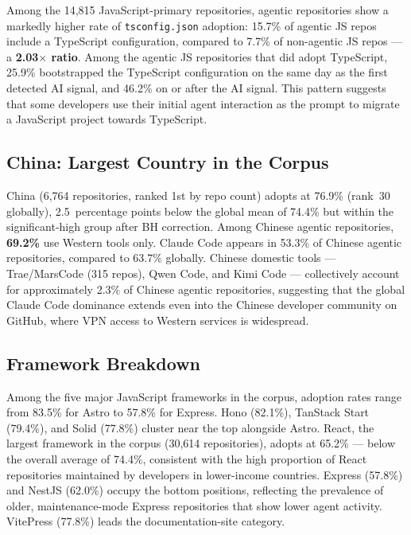 Among the 14,815 JavaScript-primary repositories, agentic repositories show a markedly higher rate of \texttt{tsconfig.json} adoption: 15.7\% of agentic JS repos include a TypeScript configuration, compared to 7.7\% of non-agentic JS repos --- a \textbf{2.03$\times$ ratio}. Among the agentic JS repositories that did adopt TypeScript, 25.9\% bootstrapped the TypeScript configuration on the same day as the first detected AI signal, and 46.2\% on or after the AI signal. This pattern suggests that some developers use their initial agent interaction as the prompt to migrate a JavaScript project towards TypeScript.

\subsection{China: Largest Country in the Corpus}

China (6,764 repositories, ranked 1st by repo count) adopts at 76.9\% (rank~30 globally), 2.5~percentage points below the global mean of 74.4\% but within the significant-high group after BH correction. Among Chinese agentic repositories, \textbf{69.2\%} use Western tools only. Claude Code appears in 53.3\% of Chinese agentic repositories, compared to 63.7\% globally. Chinese domestic tools --- Trae/MarsCode (315 repos), Qwen Code, and Kimi Code --- collectively account for approximately 2.3\% of Chinese agentic repositories, suggesting that the global Claude Code dominance extends even into the Chinese developer community on GitHub, where VPN access to Western services is widespread.

\subsection{Framework Breakdown}

Among the five major JavaScript frameworks in the corpus, adoption rates range from 83.5\% for Astro to 57.8\% for Express. Hono (82.1\%), TanStack Start (79.4\%), and Solid (77.8\%) cluster near the top alongside Astro. React, the largest framework in the corpus (30,614 repositories), adopts at 65.2\% --- below the overall average of 74.4\%, consistent with the high proportion of React repositories maintained by developers in lower-income countries. Express (57.8\%) and NestJS (62.0\%) occupy the bottom positions, reflecting the prevalence of older, maintenance-mode Express repositories that show lower agent activity. VitePress (77.8\%) leads the documentation-site category.
